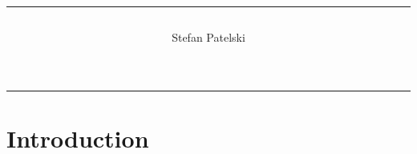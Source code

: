 \documentclass[a4paper,twoside,11pt]{article}
\title{\rule{\linewidth}{.75pt} \center{Title goes here}}
\author{Stefan Patelski}
\begin{document}
\maketitle
\vspace{-2\baselineskip}

\bigskip
\noindent\rule[2.5pt]{\textwidth}{0.75pt}

\newpage

\section{Introduction}
\end{document}
